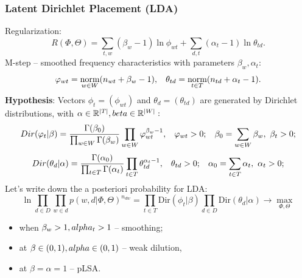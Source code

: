\documentclass[12pt]{report}
\begin{document}
\subsubsection{Latent Dirichlet Placement (LDA)}
Regularization:
\[R(\Phi, \Theta) = \sum\limits_{t,w} \left(\beta_w - 1\right)\ln \phi_{wt} + \sum\limits_{d,t} \left(\alpha_t - 1\right) \ln\theta_{td}.\]
M-step -- smoothed frequency characteristics with parameters $\beta_w, \alpha_t$:
\[\phi_{wt} = \underset{w\in W}{\text{norm}}(n_{wt} + \beta_w - 1), \hspace*{0.3cm} \theta_{td} = \underset{t\in T}{\text{norm}}(n_{td} + \alpha_t - 1).\]
\textbf{Hypothesis}: Vectors $\phi_t = \left(\phi_{wt}\right)$ and $\theta_d = \left(\theta_{td}\right)$ are generated by Dirichlet distributions, with $\alpha\in \mathbb{R}^{|T|}, \\beta\in\mathbb{R}^{|W|}:$
\[\text{$Dir(\phi_t|\beta)$} = \dfrac{\Gamma(\beta_0)}{\prod_{w\in W}\Gamma (\beta_w)} \prod_{w\in W} \phi_{wt}^{\beta_w-1}, \hspace*{0.3cm} \phi_{wt} > 0; \hspace*{0.3cm} \beta_0 = \sum\limits_{w \in W} \beta_w, \ \beta_t > 0;\]
\[\text{$Dir(\theta_d| \alpha)$} = \dfrac{\Gamma(\alpha_0)}{\prod_{t\in T}\Gamma (\alpha_t)} \prod_{t\in T} \theta_{td}^{\alpha_t-1}, \hspace*{0.3cm} \theta_{td} > 0; \hspace*{0.3cm} \alpha_0 = \sum\limits_{t \in T} \alpha_t, \ \alpha_t > 0;\]
Let's write down the a posteriori probability for LDA:
\[\ln \prod_{d\in D} \prod_{w\in d} p(w,d | \Phi, \Theta)^{n_{dw}} = \prod_{t \in T}\text{Dir}(\phi_t| \beta) \prod_{d\in D} \text{Dir}(\theta_d|\alpha) \to \max_{\Phi, \Theta}\]
\begin{itemize}
\item when $\beta_w > 1, \\alpha_t > 1$ -- smoothing;
\item at $\beta\in (0,1), \\alpha\in (0,1)$ -- weak dilution,
\item at $\beta = \alpha = 1$ -- pLSA.
\end{itemize}
\end{document}
